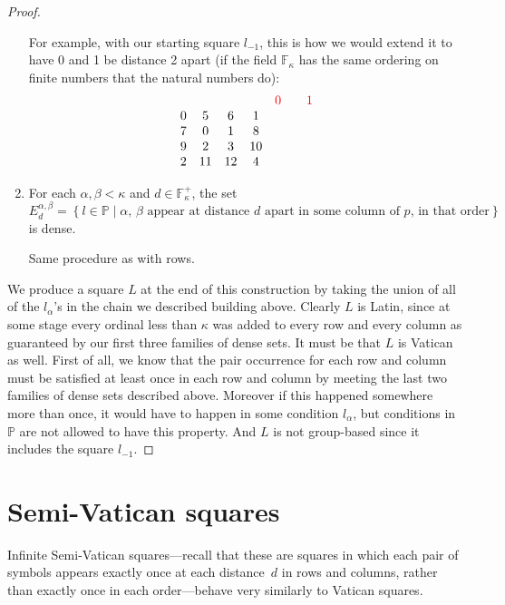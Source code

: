 \documentclass[12pt,a4paper]{article}
\newcommand{\F}{\mathbb{F}}
\newcommand{\st}{\; | \;}
\newcommand{\set}[2]{\left\{#1\st #2 \right\}}
\renewcommand{\P}{\mathbb{P}}
\begin{document}
\begin{proof}
\begin{enumerate}
	For example, with our starting square $l_{-1}$, this is how we would extend it to have 0 and 1 be distance 2 apart (if the field $\F_\kappa$ has the same ordering on finite numbers that the natural numbers do):
$$\begin{array}{ccccccc}
	& & & & \color{red}0 & &\color{red}1\\
	0 & 5 & 6 & 1 \\ 
	7 &  0 & 1 & 8  \\
	9 & 2 & 3 & 10 \\
	2 & 11 & 12 & 4 
\end{array}$$
	
	\item For each $\alpha, \beta<\kappa$ and $d \in \F_\kappa^+$, the set $$E_d^{\alpha, \beta}=\set{l \in \P}{\text{$\alpha$, $\beta$ appear at distance $d$ apart in some column of $p$, in that order}}$$ is dense.
	
	Same procedure as with rows.
	

\end{enumerate}

We produce a square $L$ at the end of this construction by taking the union of all of the $l_\alpha$'s in the chain we described building above. Clearly $L$ is Latin, since at some stage every ordinal less than $\kappa$ was added to every row and every column as guaranteed by our first three families of dense sets. It must be that $L$ is Vatican as well. First of all, we know that the pair occurrence for each row and column must be satisfied at least once in each row and column by meeting the last two families of dense sets described above. Moreover if this happened somewhere more than once, it would have to happen in some condition $l_\alpha$, but conditions in $\P$ are not allowed to have this property. And $L$ is not
group-based since it includes the square $l_{-1}$.
\end{proof}


\section{Semi-Vatican squares}\label{sec:semivat}

Infinite Semi-Vatican squares---recall that these are squares in which each pair of symbols appears exactly once at each distance~$d$ in rows and columns, rather than exactly once in each order---behave very similarly to Vatican squares.  
\end{document}
